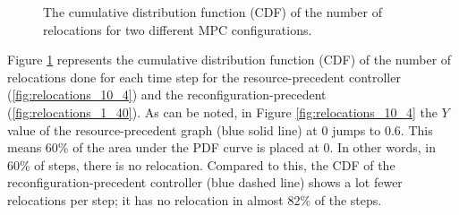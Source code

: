 \begin{figure}[h]
\centering 
{}
	\caption{The cumulative distribution function (CDF) of the number of relocations for two different MPC configurations.}
		\label{fig:case_study_one_relocations} 
\end{figure}
Figure \ref{fig:case_study_one_relocations}  represents the cumulative distribution function (CDF) of the number of relocations done for each time step for the resource-precedent controller (\ref{fig:relocations_10_4}) and the reconfiguration-precedent (\ref{fig:relocations_1_40}).
As can be noted, in Figure \ref{fig:relocations_10_4} the $Y$ value of the resource-precedent graph (blue solid line) at 0 jumps to 0.6. This means 60\% of the area under the PDF curve is placed at 0. In other words, in 60\% of steps, there is no relocation. Compared to this, the CDF of the reconfiguration-precedent controller (blue dashed line) shows a lot fewer relocations per step; it has no relocation in almost 82\% of the steps.

